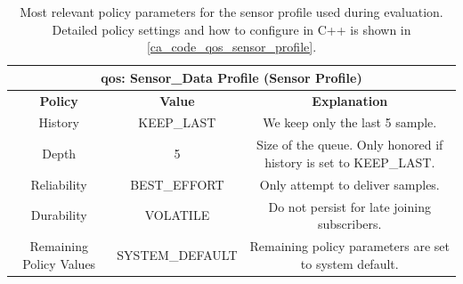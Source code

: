 \begin{table}[H]
    \centering
\begin{tabular}{ |c|c|c| }
\hline
\multicolumn{3}{|c|}{\gls{qos}: Sensor\_Data Profile (Sensor Profile)} \\
\hline
\hline
\textbf{Policy} & \textbf{Value} & \textbf{Explanation} \\\hline
    History & KEEP\_LAST &  
        \begin{minipage}{6cm}
	       \vspace{8pt}
		      We keep only the last 5 sample.
	       \vspace{8pt}
	    \end{minipage} \\\hline
    Depth & 5 &  
        \begin{minipage}{6cm}
	       \vspace{8pt}
        Size of the queue. Only honored if history is set to KEEP\_LAST.
	       \vspace{8pt}
	    \end{minipage} \\\hline
    Reliability & BEST\_EFFORT &  
        \begin{minipage}{6cm}
	       \vspace{8pt}
		      Only attempt to deliver samples.
	       \vspace{8pt}
	    \end{minipage} \\\hline
    Durability & VOLATILE & 
        \begin{minipage}{6cm}
	       \vspace{8pt}
		      Do not persist for late joining subscribers.
	       \vspace{8pt}
	    \end{minipage} \\\hline
    Remaining Policy Values & SYSTEM\_DEFAULT & 
        \begin{minipage}{6cm}
	       \vspace{8pt}
		      Remaining policy parameters are set to system default.
	       \vspace{8pt}
	    \end{minipage} \\\hline
\end{tabular}
    \caption{Most relevant policy parameters for the sensor profile used during evaluation. Detailed policy settings and how to configure in C++ is shown in \autoref{ca_code_qos_sensor_profile}.}
    \label{c6_tab_sensor_qos}
\end{table}
